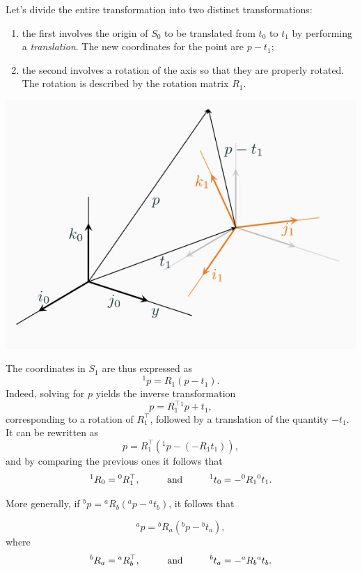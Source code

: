\documentclass[10pt]{report}
\begin{document}
Let's divide the entire transformation into two distinct transformations:
\begin{enumerate}
\item the first involves the origin of \(S_0\) to be translated from \(t_0\) to \(t_1\) by performing a \emph{translation}. The new coordinates for the point are \(p - t_1\);
\item the second involves a rotation of the axis so that they are properly rotated. The rotation is described by the rotation matrix \(R_1\).
\end{enumerate}

\begin{center}
\includegraphics[scale=0.3]{./pics/alg/rot-transl.jpg}
\end{center}

The coordinates in \(S_1\) are thus expressed as $${}^1 p = R_1(p - t_1).$$ Indeed, solving for \(p\) yields the inverse transformation $$p = R^\top_1 {}^1 p + t_1,$$ corresponding to a rotation of \(R^\top_1\), followed by a translation of the quantity \(-t_1\). It can be rewritten as $$p = R^\top_1 ({}^1 p - (-R_1 t_1)),$$ and by comparing the previous ones it follows that $${}^1 R_0 = {}^0 R^\top_1, \hspace*{1cm} \mbox{and} \hspace*{1cm} {}^1 t_0 = -{}^0 R_1 {}^0 t_1.$$

More generally, if \({}^b p = {}^aR_b({}^a p - {}^at_b)\), it follows that

$${}^a p =  {}^bR_a ({}^b p - {}^b t_a),$$ where
$${}^b R_a = {}^a R^\top_b, \hspace*{1cm} \mbox{and} \hspace*{1cm} {}^b t_a = -{}^a R_b {}^a t_b.$$
\end{document}
